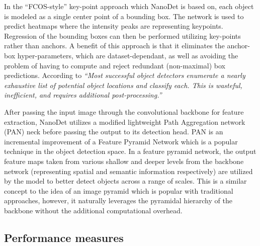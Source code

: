 \documentclass[a4paper,twoside,12pt]{report}
\begin{document}
In the ``FCOS-style'' key-point approach which NanoDet is based on, each object is modeled as a single center point of a bounding box. The network is used to predict heatmaps where the intensity peaks are representing keypoints. Regression of the bounding boxes can then be performed utilizing key-points rather than anchors. A benefit of this approach is that it eliminates the anchor-box hyper-parameters, which are dataset-dependant, as well as avoiding the problem of having to compute and reject redundant (non-maximal) box predictions. According to \cite{cnet} \textit{``Most successful object detectors enumerate a nearly exhaustive list of potential object locations and classify each. This is wasteful, inefficient, and requires additional post-processing.''}   

After passing the input image through the convolutional backbone for feature extraction, NanoDet utilizes a modified lightweight Path Aggregation network (PAN) \citep{pan, nanodet} neck before passing the output to its detection head. PAN is an incremental improvement of a Feature Pyramid Network \citep{fpn} which is a popular technique in the object detection space. In a feature pyramid network, the output feature maps taken from various shallow and deeper levels from the backbone network (representing spatial and semantic information respectively) are utilized by the model to better detect objects across a range of scales. This is a similar concept to the idea of an image pyramid which is popular with traditional approaches, however, it naturally leverages the pyramidal hierarchy of the backbone without the additional computational overhead.

\subsection{Performance measures}
\end{document}
